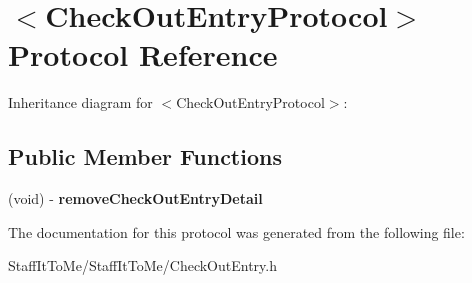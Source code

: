 \hypertarget{protocol_check_out_entry_protocol-p}{
\section{$<$\-Check\-Out\-Entry\-Protocol$>$ \-Protocol \-Reference}
\label{protocol_check_out_entry_protocol-p}
}


\-Inheritance diagram for $<$\-Check\-Out\-Entry\-Protocol$>$\-:
\subsection*{\-Public \-Member \-Functions}
\begin{DoxyCompactItemize}
\item 
\hypertarget{protocol_check_out_entry_protocol-p_aee706f4c00e40e95b3dc68d9563715bd}{
(void) -\/ {\bfseries remove\-Check\-Out\-Entry\-Detail}}
\label{protocol_check_out_entry_protocol-p_aee706f4c00e40e95b3dc68d9563715bd}

\end{DoxyCompactItemize}


\-The documentation for this protocol was generated from the following file\-:\begin{DoxyCompactItemize}
\item 
\-Staff\-It\-To\-Me/\-Staff\-It\-To\-Me/\-Check\-Out\-Entry.\-h\end{DoxyCompactItemize}
